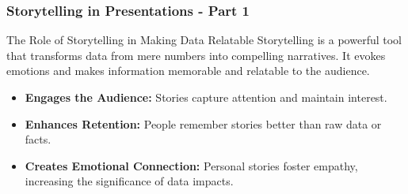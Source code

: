 \documentclass[aspectratio=169]{beamer}
\begin{document}
\begin{frame}[fragile]
    \frametitle{Storytelling in Presentations - Part 1}
    
    \begin{block}{The Role of Storytelling in Making Data Relatable}
        Storytelling is a powerful tool that transforms data from mere numbers into compelling narratives. It evokes emotions and makes information memorable and relatable to the audience.
    \end{block}
    
    \begin{itemize}
        \item \textbf{Engages the Audience:} Stories capture attention and maintain interest.
        \item \textbf{Enhances Retention:} People remember stories better than raw data or facts.
        \item \textbf{Creates Emotional Connection:} Personal stories foster empathy, increasing the significance of data impacts.
    \end{itemize}
\end{frame}
\end{document}
